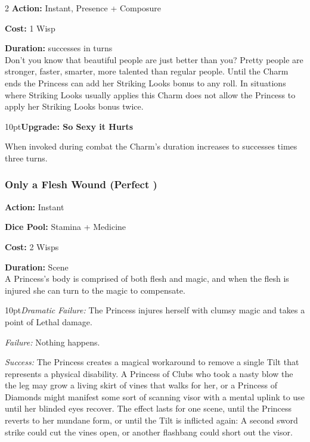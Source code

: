 \begin{multicols}{2}
\noindent \textbf{Action:} Instant, Presence + Composure

\noindent \textbf{Cost:} 1 Wisp

\noindent \textbf{Duration:} successes in turns \\

\noindent Don't you know that beautiful people are just better than you? Pretty people are stronger, faster, smarter, more talented than regular people. Until the Charm ends the Princess can add her Striking Looks bonus to any roll. In situations where Striking Looks usually applies this Charm does not allow the Princess to apply her Striking Looks bonus twice.

\begin{myindentpar}{10pt}\textbf{Upgrade: So Sexy it Hurts}

When invoked during combat the Charm's duration increases to successes times three turns.\end{myindentpar}

\subsubsection*{Only a Flesh Wound (Perfect \textbullet\textbullet)}

\noindent \textbf{Action:} Instant

\noindent \textbf{Dice Pool:} Stamina + Medicine

\noindent \textbf{Cost:} 2 Wisps 

\noindent \textbf{Duration:} Scene \\

\noindent A Princess's body is comprised of both flesh and magic, and when the flesh is injured she can turn to the magic to compensate. 

\begin{myindentpar}{10pt}\emph{Dramatic Failure:} The Princess injures herself with clumsy magic and takes a point of Lethal damage. 
 
\emph{Failure:} Nothing happens. 

\emph{Success:} The Princess creates a magical workaround to remove a single Tilt that represents a physical disability. A Princess of Clubs who took a nasty blow the the leg may grow a living skirt of vines that walks for her, or a Princess of Diamonds might manifest some sort of scanning visor with a mental uplink to use until her blinded eyes recover. The effect lasts for one scene, until the Princess reverts to her mundane form, or until the Tilt is inflicted again: A second sword strike could cut the vines open, or another flashbang could short out the visor. 


\end{myindentpar}
\end{multicols}
